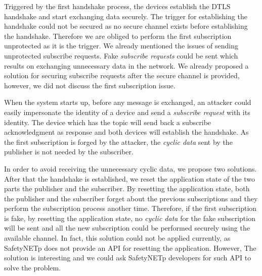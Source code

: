 Triggered by the first handshake process, the devices establish the DTLS handshake and start exchanging
data securely. The trigger for establishing the handshake could not be secured as no secure channel exists
before establishing the handshake. Therefore we are obliged to perform the first subscription unprotected as it is the trigger.
We already mentioned the issues of sending unprotected subscribe requests. Fake \textit{subscribe requests} could be sent
which results on exchanging unnecessary data in the network. We already proposed a solution for securing subscribe requests
after the secure channel is provided, however, we did not discuss the first subscription issue.

When the system starts up, before any message is exchanged, an attacker could easily impersonate the identity
of a device and send a \textit{subscribe request} with its identity. The device which has the topic will send back a
subscribe acknowledgment as response and both devices will establish the handshake. As the first subscription is
forged by the attacker, the \textit{cyclic data} sent by the publisher is not needed by the subscriber.

In order to avoid receiving the unnecessary cyclic data, we propose two solutions.
After that the handshake is established, we reset the application state of the two parts the publisher and the subscriber.
By resetting the application state, both the publisher and the subscriber forget about the previous subscriptions
and they perform the subscription process another time. Therefore, if the first subscription is fake, by resetting the
application state, no \textit{cyclic data} for the fake subscription will be sent and all the new subscription could be performed
securely using the available channel. In fact, this solution could not be applied currently, as SafetyNETp does not provide
an API for resetting the application. However, The solution is interesting and we could ask SafetyNETp developers for such API to solve the problem.

